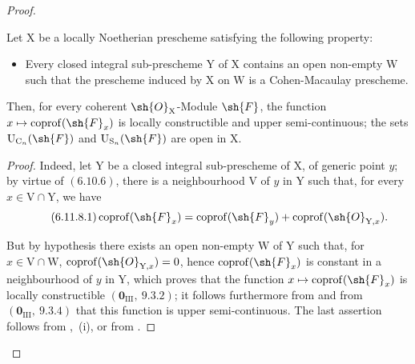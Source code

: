 \begin{proof}

\begin{proposition}[6.11.8]
\label{IV.6.11.8}
Let $\mathrm{X}$ be a locally Noetherian prescheme satisfying the following property:
\begin{itemize}
  \item[\textnormal{(CMU)}] Every closed integral sub-prescheme $\mathrm{Y}$ of $\mathrm{X}$ contains an open non-empty $\mathrm{W}$ such that the prescheme induced by $\mathrm{X}$ on $\mathrm{W}$
is a Cohen-Macaulay prescheme.
\end{itemize}
Then, for every coherent $\sh{O}_\mathrm{X}$-Module $\sh{F}$, the function $x\mapsto\operatorname{coprof}(\sh{F}_x)$ is locally constructible and upper
semi-continuous; the sets $\mathrm{U}_{\mathrm{C}_n}(\sh{F})$ and $\mathrm{U}_{\mathrm{S}_n}(\sh{F})$ are open in $\mathrm{X}$.
\end{proposition}

\begin{proof}
Indeed, let $\mathrm{Y}$ be a closed integral sub-prescheme of $\mathrm{X}$, of generic point $y$; by virtue of $(6.10.6)$, there is a
neighbourhood $\mathrm{V}$ of $y$ in $\mathrm{Y}$ such that, for every $x\in\mathrm{V}\cap\mathrm{Y}$, we have
\begin{equation}
\tag{6.11.8.1}
\label{IV.6.11.8.1}
  \operatorname{coprof}(\sh{F}_x)=\operatorname{coprof}(\sh{F}_y)+\operatorname{coprof}(\sh{O}_{\mathrm{Y},x}).
\end{equation}

But by hypothesis there exists an open non-empty $\mathrm{W}$ of $\mathrm{Y}$ such that, for $x\in\mathrm{V}\cap\mathrm{W}$, $\operatorname{coprof}(\sh{O}_{\mathrm{Y},x})=0$,
hence $\operatorname{coprof}(\sh{F}_x)$ is constant in a neighbourhood of $y$ in $\mathrm{Y}$, which proves that the function
$x\mapsto\operatorname{coprof}(\sh{F}_x)$ is
locally constructible $(\mathbf{0}_{\mathrm{III}},~9.3.2)$; it follows furthermore from  and from $(\mathbf{0}_{\mathrm{III}},~9.3.4)$ that this function
is upper semi-continuous. The last assertion follows from ,~(i), or from .
\end{proof}


\end{proof}
